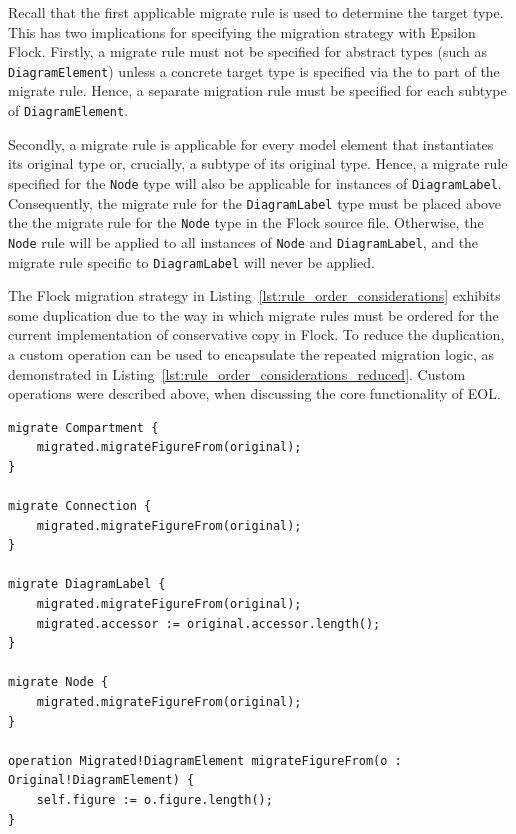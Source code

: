 Recall that the first applicable migrate rule is used to determine the target type. This has two implications for specifying the migration strategy with Epsilon Flock. Firstly, a migrate rule must not be specified for abstract types (such as \texttt{Di\-ag\-r\-amEl\-em\-e\-nt}) unless a concrete target type is specified via the to part of the migrate rule. Hence, a separate migration rule must be specified for each subtype of \texttt{Di\-ag\-r\-amEl\-em\-e\-nt}.

Secondly, a migrate rule is applicable for every model element that instantiates its original type or, crucially, a subtype of its original type. Hence, a migrate rule specified for the \texttt{Node} type will also be applicable for instances of \texttt{Di\-ag\-ra\-mLa\-b\-el}. Consequently, the migrate rule for the \texttt{Di\-ag\-ra\-mLa\-b\-el} type must be placed above the the migrate rule for the \texttt{Node} type in the Flock source file. Otherwise, the \texttt{No\-de} rule will be applied to all instances of \texttt{No\-de} and \texttt{Di\-ag\-ra\-mLa\-b\-el}, and the migrate rule specific to \texttt{Di\-ag\-ra\-mLa\-b\-el} will never be applied.

The Flock migration strategy in Listing~\ref{lst:rule_order_considerations} exhibits some duplication due to the way in which migrate rules must be ordered for the current implementation of conservative copy in Flock. To reduce the duplication, a custom operation can be used to encapsulate the repeated migration logic, as demonstrated in Listing~\ref{lst:rule_order_considerations_reduced}. Custom operations were described above, when discussing the core functionality of EOL.

\begin{lstlisting}[float=tbp, caption={[Using an operation to reduce the duplication in Listing~\ref{lst:rule_order_considerations}]Using a custom operation to reduce duplication in the migration strategy in Listing~\ref{lst:rule_order_considerations}}, label=lst:rule_order_considerations_reduced, language=Flock, tabsize=2]
migrate Compartment {
	migrated.migrateFigureFrom(original);
}

migrate Connection {
	migrated.migrateFigureFrom(original);
}

migrate DiagramLabel {
	migrated.migrateFigureFrom(original);
	migrated.accessor := original.accessor.length();
}

migrate Node {
	migrated.migrateFigureFrom(original);
}

operation Migrated!DiagramElement migrateFigureFrom(o : Original!DiagramElement) {
	self.figure := o.figure.length();
}
\end{lstlisting}

